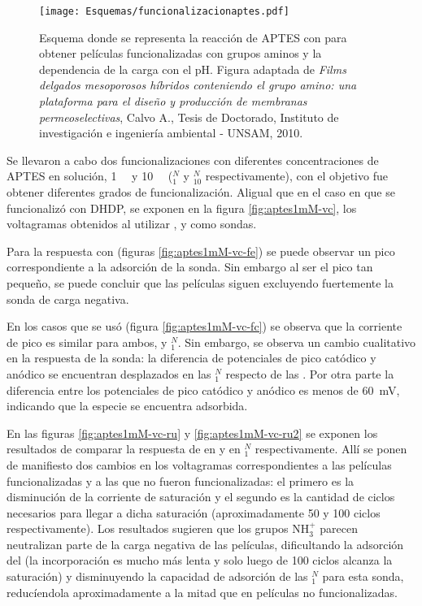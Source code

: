 				 \begin{figure}[h!]	
					\centering
			 	    \texttt{[image: Esquemas/funcionalizacionaptes.pdf]}
			        \caption[Funcionalización con APTES 1mM]{Esquema donde se representa la reacción de APTES con \pdmZ\space para obtener películas funcionalizadas con grupos aminos y la dependencia de la carga con el pH. Figura adaptada de \textit{Films delgados mesoporosos híbridos conteniendo el grupo amino: una plataforma para el diseño y producción de membranas permeoselectivas}, Calvo A., Tesis de Doctorado, Instituto de investigación e ingeniería ambiental - UNSAM, 2010.\cite{Calvo20210}}
			        \label{esq:aptes-esquema}
			      	\end{figure}

			\vspace*{3mm}Se llevaron a cabo dos funcionalizaciones con diferentes concentraciones de APTES en solución, \SI{1}{\milli\Molar} y \SI{10}{\milli\Molar} (\pdmZ$^N_{1}$ y \pdmZ$^N_{10}$ respectivamente), con el objetivo fue obtener diferentes grados de funcionalización\cite{Calvo20210,Angelome2008,Fuertes2010}. Al\space igual que en el caso en que se funcionalizó con DHDP, se exponen en la figura \ref{fig:aptes1mM-vc}, los voltagramas obtenidos al utilizar \fe, \fc\space y \ru\space como sondas.

			Para la respuesta con \fe\space (figuras \ref{fig:aptes1mM-vc-fe}) se puede observar un pico correspondiente a la adsorción de la sonda. Sin embargo al ser el pico tan pequeño, se puede concluir que las películas siguen excluyendo fuertemente la sonda de carga negativa.

			En los casos que se usó \fc\space (figura \ref{fig:aptes1mM-vc-fc}) se observa que la corriente de pico es similar para ambos, \pdmZ\space y \pdmZ$^N_1$. Sin embargo, se observa un cambio cualitativo en la respuesta de la sonda: la diferencia de potenciales de pico catódico y anódico se encuentran desplazados en las \pdmZ$^N_1$ respecto de las \pdmZ. Por otra parte la diferencia entre los potenciales de pico catódico y anódico es menos de \SI{60}{\milli\volt}, indicando que la especie se encuentra adsorbida. 
	  
		  \vspace*{2mm} En las figuras \ref{fig:aptes1mM-vc-ru} y \ref{fig:aptes1mM-vc-ru2} se exponen los resultados de comparar la respuesta de \ru\space en \pdmZ\space y en \pdmZ$^N_1$ respectivamente. Allí se ponen de manifiesto dos cambios en los voltagramas correspondientes a las películas funcionalizadas y a las que no fueron funcionalizadas: el primero es la disminución de la corriente de saturación y el segundo es la cantidad de ciclos necesarios para llegar a dicha saturación (aproximadamente 50 y 100 ciclos respectivamente). Los resultados sugieren que los grupos NH$_3^+$ parecen neutralizan parte de la carga negativa de las películas\cite{calvo2009f}, dificultando la adsorción del \ru\space (la incorporación es mucho más lenta y solo luego de 100 ciclos alcanza la saturación) y disminuyendo la capacidad de adsorción de las \pdmZ$^N_{1}$ para esta sonda, reducíendola aproximadamente a la mitad que en películas no funcionalizadas.

